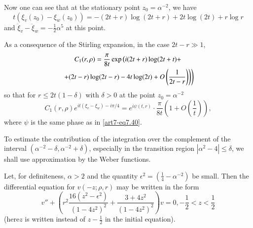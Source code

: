 Now one can see that at the stationary point $z_0= \alpha^{-2}$, we have 
\begin{equation}
t (\xi_v (z_0) - \xi_w(z_0))  = - (2t +r) \log (2t+r) + 2 t \log (2t) + r \log r \label{art7-eq7.44}
\end{equation}
and $\ddot{\xi}_v - \ddot{\xi}_w = - \frac{1}{2} \alpha^5$ at this point.

As a consequence of the Stirling expansion, in the case $2t - r \gg 1$,
\begin{gather}
C_1 (r, \rho) = \frac{\pi}{8t} \exp \left(i (2t + r)\log (2t+t) + \right.\label{art7-eq7.45}\\
\left.\left. + (2t -r) \log (2t - r) - 4 t \log (2t) + O \left(\frac{1}{2t -r} \right) \right) \right)\notag
\end{gather}
so that for $r \leqslant 2 t (1-\delta)$ with $\delta >0$ at the point $z_0 = \alpha^{-2}$
\begin{equation}
C_1 (r, \rho) e^{it(\xi_v - \xi_w)-i\pi/4} = e^{i\psi (t,r)} \cdot \frac{\pi}{8t} \left(1+ O \left(\frac{1}{t} \right) \right),
\label{art7-eq7.46}
\end{equation}
where $\psi$ is the same phase as in \eqref{art7-eq7.40}.

To estimate the contribution of the integration over the complement of the interval $(\alpha^{-2} - \delta, \alpha^{-2} + \delta)$, especially in the transition region $|\alpha^2 - 4|\leqslant \delta$, we shall use approximation by the Weber functions.

Let, for definiteness, $\alpha >2$ and the quantity $\epsilon^2 = (\frac{1}{4} - \alpha^{-2})$ be small. Then the differential equation for $v(-z; \rho, r)$ may be written in the form 
\begin{equation}
v'' + \left(r^2 \frac{16(z^2 - \epsilon^2)}{(1-4z^2)^2} + \frac{3+4z^2}{(1-4z^2)^2} \right) v = 0, -\frac{1}{2} < z < \frac{1}{2} \label{art7-eq7.47}
\end{equation}
(here\pageoriginale $z$ is written instead of $z -\frac{1}{2}$ in the initial equation).


